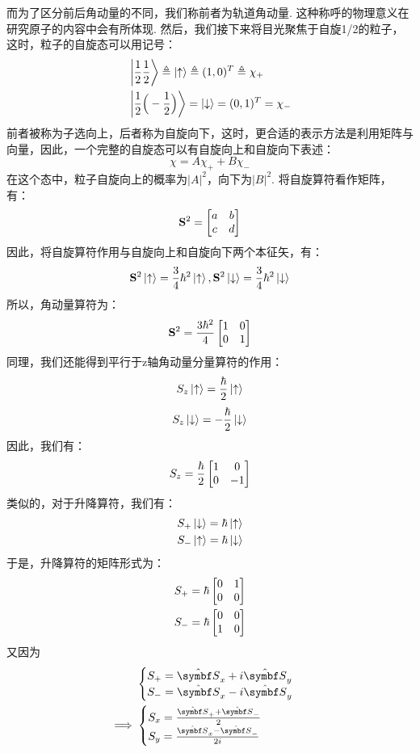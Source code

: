 而为了区分前后角动量的不同，我们称前者为轨道角动量. 这种称呼的物理意义在研究原子的内容中会有所体现. 然后，我们接下来将目光聚焦于自旋1/2的粒子，
这时，粒子的自旋态可以用记号：
\begin{align*}
& \ket{\frac{1}{2}\frac{1}{2}}\triangleq \ket{\uparrow}\triangleq(1,0)^{T}\triangleq\chi_{+} \\
& \ket{\frac{1}{2}\Big(-\frac{1}{2}\Big)}=\ket{\downarrow} = (0,1)^{T} = \chi_{{-}}
\end{align*}
前者被称为子选向上，后者称为自旋向下，这时，更合适的表示方法是利用矩阵与向量，因此，一个完整的自旋态可以有自旋向上和自旋向下表述：
\[
\chi = A\chi_{+} + B\chi_{-}
\]
在这个态中，粒子自旋向上的概率为\(|A|^{2}\)，向下为\(|B|^{2}\). 将自旋算符看作矩阵，有：
\[
{\mathbf{S}}^{2} =
\begin{bmatrix}
a & b \\
c & d
\end{bmatrix}
\]
因此，将自旋算符作用与自旋向上和自旋向下两个本征矢，有：
\[
{\mathbf{S}}^{2}\ket{\uparrow} = \frac{3}{4}\hbar^2\ket{\uparrow}, \mathbf{S}^{2}\ket{\downarrow}= \frac{3}{4}\hbar^2\ket{\downarrow}
\]
所以，角动量算符为：
\[
{\mathbf{S}}^{2} = \frac{3\hbar^2}{4}
\begin{bmatrix}
1 & 0 \\
0 & 1 
\end{bmatrix}
\]
同理，我们还能得到平行于z轴角动量分量算符的作用：
\[
{S}_{z}\ket{\uparrow} = \frac{\hbar}{2}\ket{\uparrow} 
\]
\[
{S}_{z}\ket{\downarrow} = -\frac{\hbar}{2}\ket{\downarrow}
\]
因此，我们有：
\[
{S}_{z} = \frac{\hbar}{2} 
\begin{bmatrix}
1 & 0 \\
0 & -1
\end{bmatrix}
\]
类似的，对于升降算符，我们有：
\begin{align*}
& {S}_{+}\ket{\downarrow} = \hbar\ket{\uparrow} \\
& {S}_{-}\ket{\uparrow} = \hbar\ket{\downarrow}
\end{align*}
于是，升降算符的矩阵形式为：
\begin{align*}
& {S}_{+} = \hbar
\begin{bmatrix}
0 & 1 \\
0 & 0
\end{bmatrix} \\
& {S}_{-} = \hbar
\begin{bmatrix}
0 & 0 \\
1 & 0
\end{bmatrix}
\end{align*}
又因为
\begin{align*}
& 
\begin{cases}
{S}_{+} = \uv{S}_{x} + i\uv{S}_{y} \\
{S}_{-} = \uv{S}_{x} - i\uv{S}_{y} \\ 
\end{cases} \\
\Longrightarrow\ 
& \begin{cases}
{S}_{x} = \frac{\uv{S}_{+} + \uv{S}_{-}}{2} \\
{S}_{y} = \frac{\uv{S}_{x} - \uv{S}_{-}}{2i}
\end{cases}
\end{align*}
